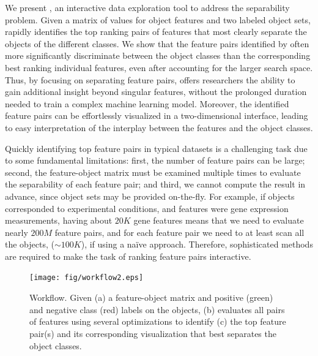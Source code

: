 We present \genviz,
an interactive data exploration tool to address the separability problem.
Given a matrix of values for object features
and two labeled object sets, \genviz rapidly identifies
the top ranking pairs of features
that most clearly separate the objects of
the different classes.
We show that the feature pairs identified by \genviz often more significantly
discriminate between the object classes than the corresponding
best ranking individual features, even after accounting for the larger search space.
Thus, by focusing on separating feature pairs, \genviz
offers researchers the ability to gain additional
insight beyond singular features, without the prolonged duration
needed to train a complex machine learning model.
Moreover, the identified feature pairs can be effortlessly
visualized in a two-dimensional interface,
leading to easy interpretation of
the interplay between the features and the object classes.

Quickly identifying top feature pairs
in typical datasets
is a challenging task due to some fundamental limitations:
first, the number of feature pairs can be large;
second, the feature-object matrix must be examined
multiple times to evaluate the separability of
each feature pair;
and third, we cannot compute the result in advance, since
object sets may be provided on-the-fly.
For example, if objects corresponded to experimental
conditions, and features were gene expression measurements,
having about $20K$ gene features
means that we need to evaluate nearly $200M$ feature pairs,
and for each feature pair we need to at least scan all the objects,
($\sim100K$), if using a na\"ive approach.
Therefore, sophisticated methods are required
to make the task of ranking feature pairs interactive.

\begin{figure}[t]
 \centering
 \texttt{[image: fig/workflow2.eps]}
 \vspace{-15pt}
\caption{\genviz Workflow.
Given (a) a feature-object matrix and positive (green) and negative class (red) labels on the objects, \genviz (b) evaluates all pairs of features using several optimizations to identify (c) the top feature pair(s) and its corresponding visualization that best separates the object classes.}
\label{fig:workflow}
\vspace{-15pt}
\end{figure}


